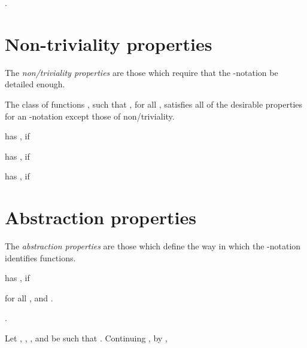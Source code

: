 \documentclass[b5paper, english, oneside]{memoir}
\begin{document}
\begin{example}
.
\end{example}

\section{Non-triviality properties}

The \emph{non\-/triviality properties} are those which require that the -notation be detailed enough. 

\begin{example}
The class of functions , such that , for all , satisfies all of the desirable properties for an -notation except those of non\-/triviality.
\end{example}

\begin{definition}
 has , if

\end{definition}

\begin{definition}
 has , if

\end{definition}

\begin{definition}
 has , if

\end{definition}

\section{Abstraction properties}

The \emph{abstraction properties} are those which define the way in which the -notation identifies functions. 

\begin{definition}
 has , if

for all , and .
\end{definition}

\begin{example}
.
\end{example}

\begin{example}
Let , , , and  be such that . Continuing , by ,

\end{example}
\end{document}
